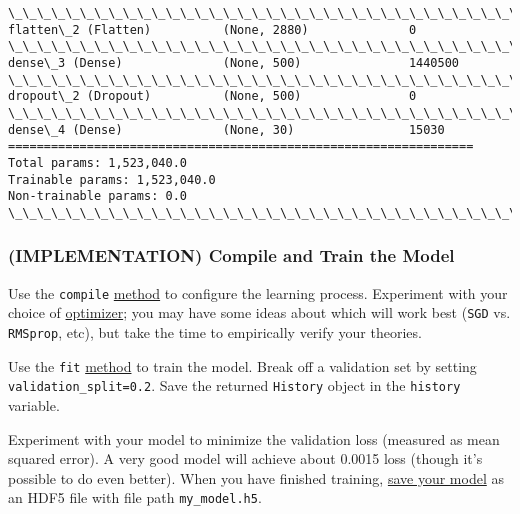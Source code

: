 \documentclass[11pt]{article}
\begin{document}
\begin{Verbatim}[commandchars=\\\{\}]
\_\_\_\_\_\_\_\_\_\_\_\_\_\_\_\_\_\_\_\_\_\_\_\_\_\_\_\_\_\_\_\_\_\_\_\_\_\_\_\_\_\_\_\_\_\_\_\_\_\_\_\_\_\_\_\_\_\_\_\_\_\_\_\_\_
flatten\_2 (Flatten)          (None, 2880)              0         
\_\_\_\_\_\_\_\_\_\_\_\_\_\_\_\_\_\_\_\_\_\_\_\_\_\_\_\_\_\_\_\_\_\_\_\_\_\_\_\_\_\_\_\_\_\_\_\_\_\_\_\_\_\_\_\_\_\_\_\_\_\_\_\_\_
dense\_3 (Dense)              (None, 500)               1440500   
\_\_\_\_\_\_\_\_\_\_\_\_\_\_\_\_\_\_\_\_\_\_\_\_\_\_\_\_\_\_\_\_\_\_\_\_\_\_\_\_\_\_\_\_\_\_\_\_\_\_\_\_\_\_\_\_\_\_\_\_\_\_\_\_\_
dropout\_2 (Dropout)          (None, 500)               0         
\_\_\_\_\_\_\_\_\_\_\_\_\_\_\_\_\_\_\_\_\_\_\_\_\_\_\_\_\_\_\_\_\_\_\_\_\_\_\_\_\_\_\_\_\_\_\_\_\_\_\_\_\_\_\_\_\_\_\_\_\_\_\_\_\_
dense\_4 (Dense)              (None, 30)                15030     
=================================================================
Total params: 1,523,040.0
Trainable params: 1,523,040.0
Non-trainable params: 0.0
\_\_\_\_\_\_\_\_\_\_\_\_\_\_\_\_\_\_\_\_\_\_\_\_\_\_\_\_\_\_\_\_\_\_\_\_\_\_\_\_\_\_\_\_\_\_\_\_\_\_\_\_\_\_\_\_\_\_\_\_\_\_\_\_\_

    \end{Verbatim}

    \hypertarget{implementation-compile-and-train-the-model}{%
\subsubsection{(IMPLEMENTATION) Compile and Train the
Model}\label{implementation-compile-and-train-the-model}}

Use the \texttt{compile}
\href{https://keras.io/models/sequential/\#sequential-model-methods}{method}
to configure the learning process. Experiment with your choice of
\href{https://keras.io/optimizers/}{optimizer}; you may have some ideas
about which will work best (\texttt{SGD} vs. \texttt{RMSprop}, etc), but
take the time to empirically verify your theories.

Use the \texttt{fit}
\href{https://keras.io/models/sequential/\#sequential-model-methods}{method}
to train the model. Break off a validation set by setting
\texttt{validation\_split=0.2}. Save the returned \texttt{History}
object in the \texttt{history} variable.

Experiment with your model to minimize the validation loss (measured as
mean squared error). A very good model will achieve about 0.0015 loss
(though it's possible to do even better). When you have finished
training,
\href{https://keras.io/getting-started/faq/\#how-can-i-save-a-keras-model}{save
your model} as an HDF5 file with file path \texttt{my\_model.h5}.
\end{document}
